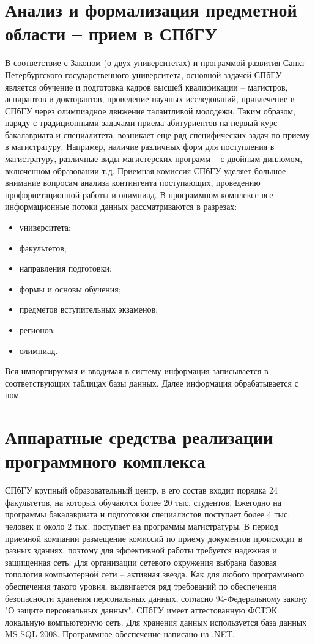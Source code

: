 \documentclass[]{article}
\begin{document}
\section{Анализ и формализация предметной области  -- прием в СПбГУ}
В соответствие с Законом (о двух университетах) и программой развития Санкт-Петербургского государственного университета, основной задачей СПбГУ является обучение и подготовка кадров высшей квалификации – магистров, аспирантов и докторантов, проведение научных исследований, привлечение в СПбГУ через олимпиадное движение талантливой молодежи. Таким образом, наряду с традиционными задачами приема абитуриентов на первый курс бакалавриата и специалитета, возникает еще ряд специфических задач по приему в магистратуру. Например, наличие различных форм для поступления в магистратуру, различные виды магистерских программ – с двойным дипломом, включенном образовании т.д. Приемная комиссия СПбГУ уделяет большое внимание вопросам анализа контингента поступающих, проведению профориетационной работы и олимпиад. В программном комплексе все информационные потоки данных рассматриваются в разрезах: 
\begin{itemize}
\item университета;
\item факультетов;
\item направления подготовки;
\item формы и основы обучения;
\item предметов вступительных экзаменов;
\item регионов;
\item олимпиад.
\end{itemize}

Вся импортируемая и вводимая в систему информация записывается в соответствующих таблицах базы данных. Далее информация обрабатывается с пом

\section{Аппаратные средства реализации программного комплекса}

СПбГУ крупный образовательный центр, в его состав входит порядка 24 факультетов, на которых обучаются более 20 тыс. студентов. Ежегодно на программы бакалавриата и подготовки специалистов поступает более 4 тыс. человек и около 2 тыс. поступает на программы магистратуры. В период приемной компании размещение комиссий по приему документов происходит в разных зданиях, поэтому для эффективной работы требуется надежная и защищенная сеть. Для организации сетевого окружения выбрана базовая топология компьютерной сети – активная звезда. Как для любого программного обеспечения такого уровня, выдвигается ряд требований по обеспечения безопасности хранения персональных данных, согласно 94-Федеральному закону "О защите персональных данных". СПбГУ имеет аттестованную ФСТЭК локальную компьютерную сеть. Для хранения данных используется база данных MS SQL 2008. Программное обеспечение написано на .NET.
\end{document}
